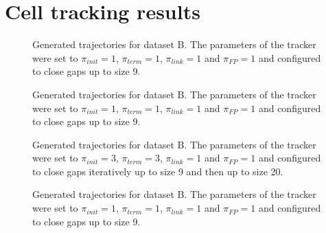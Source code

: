 \chapter{Cell tracking results}
	\label{app:appendix_trackingresults}

\begin{figure}
	\caption{Generated trajectories for dataset B. The parameters of the tracker were set to $\pi_{init}=1$, $\pi_{term}=1$, $\pi_{link}=1$ and $\pi_{FP}=1$ and configured to close gaps up to size 9.}
	\label{fig:results_detector_sequences_2}
\end{figure}


\begin{figure}
	\caption{Generated trajectories for dataset B. The parameters of the tracker were set to $\pi_{init}=1$, $\pi_{term}=1$, $\pi_{link}=1$ and $\pi_{FP}=1$ and configured to close gaps up to size 9.}
	\label{fig:results_detector_sequences_3}
\end{figure}

\begin{figure}
	\caption{Generated trajectories for dataset B. The parameters of the tracker were set to $\pi_{init}=3$, $\pi_{term}=3$, $\pi_{link}=1$ and $\pi_{FP}=1$ and configured to close gaps iteratively up to size 9 and then up to size 20.}
	\label{fig:results_detector_sequences_4}
\end{figure}
\begin{figure}
	\caption{Generated trajectories for dataset B. The parameters of the tracker were set to $\pi_{init}=1$, $\pi_{term}=1$, $\pi_{link}=1$ and $\pi_{FP}=1$ and configured to close gaps up to size 9.}
	\label{fig:results_detector_sequences_5}
\end{figure}			